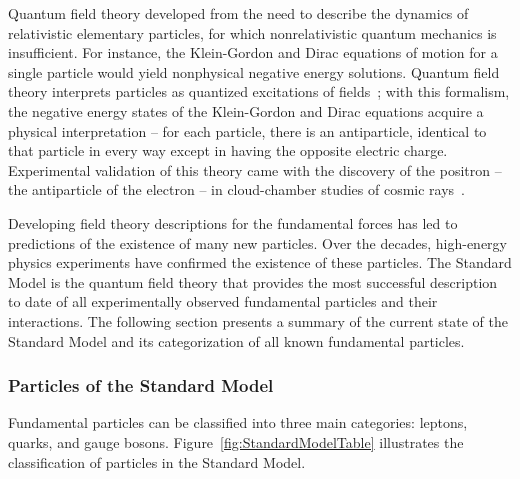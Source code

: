 
Quantum field theory developed from the need to describe the dynamics of relativistic elementary particles, for which nonrelativistic quantum mechanics is insufficient. For instance, the Klein-Gordon and Dirac equations of motion for a single particle would yield nonphysical negative energy solutions. Quantum field theory interprets particles as quantized excitations of fields~\cite{PeskinSchroederPhysics}; with this formalism, the negative energy states of the Klein-Gordon and Dirac equations acquire a physical interpretation -- for each particle, there is an antiparticle, identical to that particle in every way except in having the opposite electric charge. Experimental validation of this theory came with the discovery of the positron -- the antiparticle of the electron -- in cloud-chamber studies of cosmic rays~\cite{BettiniPhysics}.

Developing field theory descriptions for the fundamental forces has led to predictions of the existence of many new particles. Over the decades, high-energy physics experiments have confirmed the existence of these particles. The Standard Model is the quantum field theory that provides the most successful description to date of all experimentally observed fundamental particles and their interactions. The following section presents a summary of the current state of the Standard Model and its categorization of all known fundamental particles.

\subsubsection{Particles of the Standard Model\label{sec:SM-particles}}

Fundamental particles can be classified into three main categories: leptons, quarks, and gauge bosons. Figure~\ref{fig:StandardModelTable} illustrates the classification of particles in the Standard Model.

